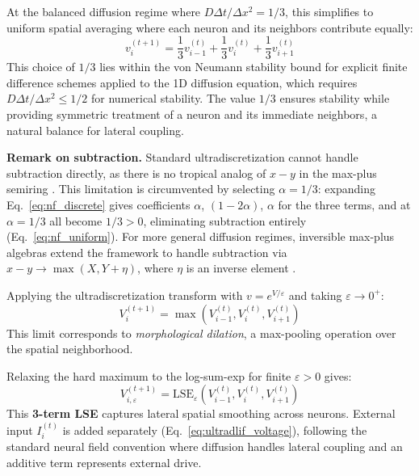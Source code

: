 \documentclass{article}
\theoremstyle{plain}
\theoremstyle{definition}
\theoremstyle{remark}
\newcommand{\lse}{\mathrm{LSE}}
\newcommand{\eps}{\varepsilon}
\begin{document}
At the balanced diffusion regime where $D\Delta t/\Delta x^2 = 1/3$, this simplifies to uniform spatial averaging where each neuron and its neighbors contribute equally:
\begin{equation}
v_i^{(t+1)} = \frac{1}{3}v_{i-1}^{(t)} + \frac{1}{3}v_i^{(t)} + \frac{1}{3}v_{i+1}^{(t)}
\label{eq:nf_uniform}
\end{equation}
This choice of $1/3$ lies within the von Neumann stability bound for explicit finite difference schemes applied to the 1D diffusion equation, which requires $D\Delta t/\Delta x^2 \leq 1/2$ for numerical stability. The value $1/3$ ensures stability while providing symmetric treatment of a neuron and its immediate neighbors, a natural balance for lateral coupling.

\textbf{Remark on subtraction.} Standard ultradiscretization cannot handle subtraction directly, as there is no tropical analog of $x - y$ in the max-plus semiring \citep{ochiai2005inversible}. This limitation is circumvented by selecting $\alpha = 1/3$: expanding Eq.~\eqref{eq:nf_discrete} gives coefficients $\alpha$, $(1{-}2\alpha)$, $\alpha$ for the three terms, and at $\alpha = 1/3$ all become $1/3 > 0$, eliminating subtraction entirely (Eq.~\eqref{eq:nf_uniform}). For more general diffusion regimes, inversible max-plus algebras extend the framework to handle subtraction via $x - y \to \max(X, Y + \eta)$, where $\eta$ is an inverse element \citep{ochiai2005inversible}.

Applying the ultradiscretization transform with $v = e^{V/\eps}$ and taking $\eps \to 0^+$:
\begin{equation}
V_i^{(t+1)} = \max\left(V_{i-1}^{(t)}, V_i^{(t)}, V_{i+1}^{(t)}\right)
\label{eq:ultradlif_limit}
\end{equation}
This limit corresponds to \emph{morphological dilation}, a max-pooling operation over the spatial neighborhood.

Relaxing the hard maximum to the log-sum-exp for finite $\eps > 0$ gives:
\begin{equation}
V_{i,\eps}^{(t+1)} = \lse_\eps\left(V_{i-1}^{(t)}, V_i^{(t)}, V_{i+1}^{(t)}\right)
\label{eq:ultradlif_soft}
\end{equation}
This \textbf{3-term LSE} captures lateral spatial smoothing across neurons. External input $I_i^{(t)}$ is added separately (Eq.~\ref{eq:ultradlif_voltage}), following the standard neural field convention where diffusion handles lateral coupling and an additive term represents external drive.
\end{document}
